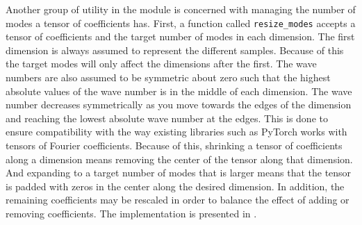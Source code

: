 Another group of utility in the module is concerned with managing the number of modes a tensor of coefficients has. First, a function called \verb|resize_modes| accepts a tensor of coefficients and the target number of modes in each dimension. The first dimension is always assumed to represent the different samples. Because of this the target modes will only affect the dimensions after the first. The wave numbers are also assumed to be symmetric about zero such that the highest absolute values of the wave number is in the middle of each dimension. The wave number decreases symmetrically as you move towards the edges of the dimension and reaching the lowest absolute wave number at the edges. This is done to ensure compatibility with the way existing libraries such as PyTorch works with tensors of Fourier coefficients. Because of this, shrinking a tensor of coefficients along a dimension means removing the center of the tensor along that dimension. And expanding to a target number of modes that is larger means that the tensor is padded with zeros in the center along the desired dimension. In addition, the remaining coefficients may be rescaled in order to balance the effect of adding or removing coefficients. The implementation is presented in .

